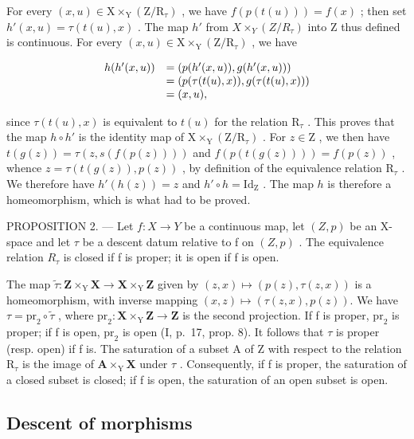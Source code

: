 For every \((x,u)\in\mathrm{X}\times_{\mathrm{Y}}(\mathrm{Z}/\mathrm{R}_{\tau})\) , we have \(f(p(t(u)))=f(x)\) ; then set \(h'(x,u)=\tau(t(u),x)\) . The map \(h'\) from \(X\times_{Y}(Z/R_{\tau})\) into Z thus defined is continuous. For every \((x,u)\in\mathrm{X}\times_{\mathrm{Y}}(\mathrm{Z}/\mathrm{R}_{\tau})\) , we have

\[
\begin{array}{r l} h (h ^ {\prime} (x, u)) & = (p (h ^ {\prime} (x, u)), g (h ^ {\prime} (x, u))) \\ & = (p (\tau (t (u), x)), g (\tau (t (u), x))) \\ & = (x, u), \end{array}
\]

since \(\tau(t(u), x)\) is equivalent to \(t(u)\) for the relation \(\mathrm{R}_{\tau}\) . This proves that the map \(h \circ h'\) is the identity map of \(\mathrm{X} \times_{\mathrm{Y}} (\mathrm{Z}/\mathrm{R}_{\tau})\) . For \(z \in \mathrm{Z}\) , we then have \(t(g(z)) = \tau(z, s(f(p(z))))\) and \(f(p(t(g(z)))) = f(p(z))\) , whence \(z = \tau(t(g(z)), p(z))\) , by definition of the equivalence relation \(\mathrm{R}_{\tau}\) . We therefore have \(h'(h(z)) = z\) and \(h' \circ h = \mathrm{Id}_{\mathrm{Z}}\) . The map \(h\) is therefore a homeomorphism, which is what had to be proved.

PROPOSITION 2. --- Let \(f\colon X \to Y\) be a continuous map, let \((Z,p)\) be an X-space and let \(\tau\) be a descent datum relative to f on \((Z,p)\) . The equivalence relation \(R_{\tau}\) is closed if f is proper; it is open if f is open.

The map \(\widetilde{\tau}\colon\mathbf{Z}\times_{\mathrm{Y}}\mathbf{X}\to\mathbf{X}\times_{\mathrm{Y}}\mathbf{Z}\) given by \((z,x)\mapsto(p(z),\tau(z,x))\) is a homeomorphism, with inverse mapping \((x,z)\mapsto(\tau(z,x),p(z)).\) We have \(\tau=\mathrm{pr}_{2}\circ\widetilde{\tau}\) , where \(\mathrm{pr}_{2}\colon\mathbf{X}\times_{\mathrm{Y}}\mathbf{Z}\to\mathbf{Z}\) is the second projection. If f is proper, \(\mathrm{pr}_{2}\) is proper; if f is open, \(\mathrm{pr}_{2}\) is open (I, p.~17, prop. 8). It follows that \(\tau\) is proper (resp. open) if f is. The saturation of a subset A of Z with respect to the relation \(\mathrm{R}_{\tau}\) is the image of \(\mathbf{A}\times_{\mathrm{Y}}\mathbf{X}\) under \(\tau\) . Consequently, if f is proper, the saturation of a closed subset is closed; if f is open, the saturation of an open subset is open.

\subsection{Descent of morphisms}

